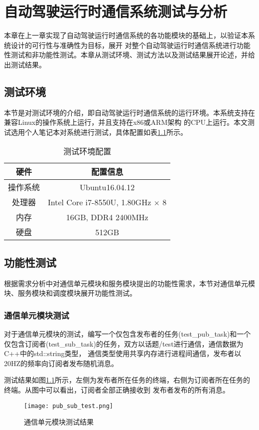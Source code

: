 \chapter{自动驾驶运行时通信系统测试与分析}
本章在上一章实现了自动驾驶运行时通信系统的各功能模块的基础上，以验证本系统设计的可行性与准确性为目标，展开
对整个自动驾驶运行时通信系统进行功能性测试和非功能性测试。本章从测试环境、测试方法以及测试结果展开论述，并给出测试结果。

\section{测试环境}
本节是对测试环境的介绍，即自动驾驶运行时通信系统的运行环境。本系统支持在兼容Linux的操作系统上运行，并且支持在x86或ARM架构
的CPU上运行。本文测试选用个人笔记本对系统进行测试，具体配置如表\ref{test_env}所示。
\begin{table}[htb]
  \centering\small
  \caption{测试环境配置}
  \label{test_env}
  \begin{tabular}{cc}
    \toprule
    硬件 & 配置信息 \\
    \midrule
    操作系统 & Ubuntu16.04.12\\
    处理器 & Intel Core i7-8550U, 1.80GHz $\times$ 8\\
    内存 & 16GB, DDR4 2400MHz\\
    硬盘 & 512GB\\
    \bottomrule
  \end{tabular}
\end{table}
    
\section{功能性测试}
根据需求分析中对通信单元模块和服务模块提出的功能性需求，本节对通信单元模块、服务模块和调度模块展开功能性测试。
\subsection{通信单元模块测试}
对于通信单元模块的测试，编写一个仅包含发布者的任务(test\_pub\_task)和一个仅包含订阅者(test\_sub\_task)的任务，双方以话题/test进行通信，通信数据为C++中的std::string类型，
通信类型使用共享内存进行进程间通信，发布者以20HZ的频率向订阅者发布随机消息。


测试结果如图\ref{pub_sub_test}所示，左侧为发布者所在任务的终端，右侧为订阅者所在任务的终端。从图中可以看出，订阅者全部正确接收到
发布者发布的所有消息。

\begin{figure}[H]
  \centering
  \texttt{[image: pub\_sub\_test.png]}
  \caption{通信单元模块测试结果}
  \label{pub_sub_test}
\end{figure}

